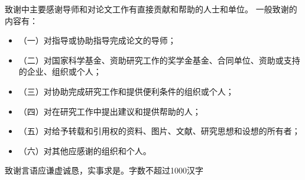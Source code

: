 致谢中主要感谢导师和对论文工作有直接贡献和帮助的人士和单位。
一般致谢的内容有：
\begin{itemize} 
    \item[]（一）对指导或协助指导完成论文的导师；
    \item[]（二）对国家科学基金、资助研究工作的奖学金基金、合同单位、资助或支持的企业、组织或个人；
    \item[]（三）对协助完成研究工作和提供便利条件的组织或个人；
    \item[]（四）对在研究工作中提出建议和提供帮助的人；
    \item[]（五）对给予转载和引用权的资料、图片、文献、研究思想和设想的所有者；
    \item[]（六）对其他应感谢的组织和个人。
\end{itemize}
致谢言语应谦虚诚恳，实事求是。字数不超过1000汉字
